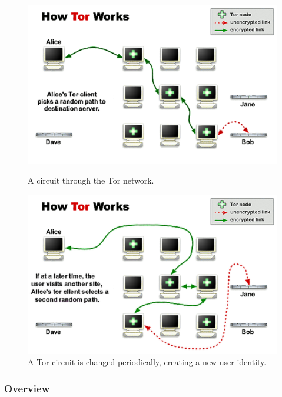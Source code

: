 \begin{figure}[htdp]
	\begin{minipage}[b]{0.45\linewidth}
		\centering
		\includegraphics[width=\textwidth]{images/Tor/circuit-building-2-5.png}
		\caption{A circuit through the Tor network.}
		\label{fig:figure1}
	\end{minipage}
	\hspace{0.5cm}
	\begin{minipage}[b]{0.45\linewidth}
		\centering
		\includegraphics[width=\textwidth]{images/Tor/circuit-change-1-4.png}
		\caption{A Tor circuit is changed periodically, creating a new user identity.}
		\label{fig:figure2}
	\end{minipage}
\end{figure}

\subsubsection{Overview}

